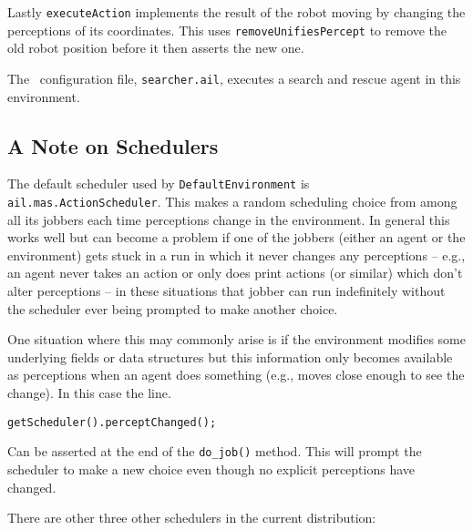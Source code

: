 Lastly \texttt{executeAction} implements the result of the robot moving by changing the perceptions of its coordinates.  This uses \texttt{removeUnifiesPercept} to remove the old robot position before it then asserts the new one.

The \ail\ configuration file, \texttt{searcher.ail}, executes a search and rescue agent in this environment.

\subsection{A Note on Schedulers}

\begin{sloppypar}
The default scheduler used by \texttt{DefaultEnvironment} is \texttt{ail.mas.ActionScheduler}.  This makes a random scheduling choice from among all its jobbers each time perceptions change in the environment.  In general this works well but can become a problem if one of the jobbers (either an agent or the environment) gets stuck in a run in which it never changes any perceptions -- e.g., an agent never takes an action or only does print actions (or similar) which don't alter perceptions -- in these situations that jobber can run indefinitely without the scheduler ever being prompted to make another choice.
\end{sloppypar}

One situation where this may commonly arise is if the environment modifies some underlying fields or data structures but this information only becomes available as perceptions when an agent does something (e.g., moves close enough to see the change).  In this case the line.
\begin{verbatim}
getScheduler().perceptChanged();
\end{verbatim}
Can be asserted at the end of the \texttt{do\_job()} method.  This will prompt the scheduler to make a new choice even though no explicit perceptions have changed.

There are other three other schedulers in the current distribution:

